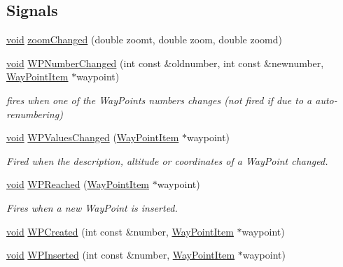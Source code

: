 \subsection*{\-Signals}
\begin{DoxyCompactItemize}
\item 
\hyperlink{group___u_a_v_objects_plugin_ga444cf2ff3f0ecbe028adce838d373f5c}{void} \hyperlink{group___o_p_map_widget_ga5f82149d3970603013155e5ace73c085}{zoom\-Changed} (double zoomt, double zoom, double zoomd)
\item 
\hyperlink{group___u_a_v_objects_plugin_ga444cf2ff3f0ecbe028adce838d373f5c}{void} \hyperlink{group___o_p_map_widget_gad5aa3c5dba212fe3975e483da178f16c}{\-W\-P\-Number\-Changed} (int const \&oldnumber, int const \&newnumber, \hyperlink{classmapcontrol_1_1_way_point_item}{\-Way\-Point\-Item} $\ast$waypoint)
\begin{DoxyCompactList}\small\item\em fires when one of the \-Way\-Points numbers changes (not fired if due to a auto-\/renumbering) \end{DoxyCompactList}\item 
\hyperlink{group___u_a_v_objects_plugin_ga444cf2ff3f0ecbe028adce838d373f5c}{void} \hyperlink{group___o_p_map_widget_ga7b05d6d31a9d3dc1fb1bf4d581884f77}{\-W\-P\-Values\-Changed} (\hyperlink{classmapcontrol_1_1_way_point_item}{\-Way\-Point\-Item} $\ast$waypoint)
\begin{DoxyCompactList}\small\item\em \-Fired when the description, altitude or coordinates of a \-Way\-Point changed. \end{DoxyCompactList}\item 
\hyperlink{group___u_a_v_objects_plugin_ga444cf2ff3f0ecbe028adce838d373f5c}{void} \hyperlink{group___o_p_map_widget_gace0e66a97e422c30b79aed508d0be81d}{\-W\-P\-Reached} (\hyperlink{classmapcontrol_1_1_way_point_item}{\-Way\-Point\-Item} $\ast$waypoint)
\begin{DoxyCompactList}\small\item\em \-Fires when a new \-Way\-Point is inserted. \end{DoxyCompactList}\item 
\hyperlink{group___u_a_v_objects_plugin_ga444cf2ff3f0ecbe028adce838d373f5c}{void} \hyperlink{group___o_p_map_widget_ga76a7138d7fd9e231e80d00430c349d03}{\-W\-P\-Created} (int const \&number, \hyperlink{classmapcontrol_1_1_way_point_item}{\-Way\-Point\-Item} $\ast$waypoint)
\item 
\hyperlink{group___u_a_v_objects_plugin_ga444cf2ff3f0ecbe028adce838d373f5c}{void} \hyperlink{group___o_p_map_widget_gaacb4d7f71ed1c2874106d276563e1348}{\-W\-P\-Inserted} (int const \&number, \hyperlink{classmapcontrol_1_1_way_point_item}{\-Way\-Point\-Item} $\ast$waypoint)

\end{DoxyCompactItemize}
